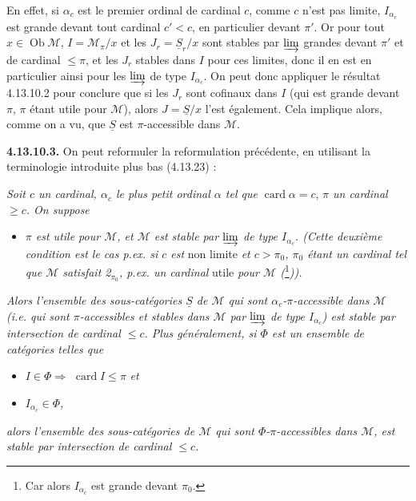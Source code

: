 \documentclass[11pt]{article}
\newcommand{\msp}[1]{\marginpar{\footnotesize [#1]}}
\newcommand{\Ob}{\operatorname{Ob}}
\newcommand{\card}{\operatorname{card}}
\begin{document}
En effet, si $\alpha_c$ est le premier ordinal de cardinal $c$, comme $c$ n'est pas limite, $I_{\alpha_c}$ est grande devant tout cardinal $c'<c$, en particulier devant $\pi'$. Or pour tout $x\in\Ob\mathcal{M}$, $I=\mathcal{M}_\pi/x$ et les $J_r=\underline{S}_r/x$ sont stables par $\varinjlim$ grandes devant $\pi'$ et de cardinal $\leqslant\pi$,
\msp{page 302 bis}
et les $J_r$ stables dans $I$ pour ces limites, donc il en est en particulier ainsi pour les $\varinjlim$ de type $I_{\alpha_c}$. On peut donc appliquer le résultat 4.13.10.2 pour conclure que si les $J_r$ sont cofinaux dans $I$ (qui est grande devant $\pi$, $\pi$ étant utile pour $\mathcal{M}$), alors $J=\underline{S}/x$ l'est également. Cela implique alors, comme on a vu, que $\underline{S}$ est $\pi$-accessible dans $\mathcal{M}$.

\textbf{4.13.10.3.} On peut reformuler la reformulation précédente, en utilisant la terminologie introduite plus bas (4.13.23) :

\textit{Soit $c$ un cardinal, $\alpha_c$ le plus petit ordinal $\alpha$ tel que} $\card\alpha=c$, \textit{$\pi$ un cardinal $\geqslant c$. On suppose}
\begin{itemize}
\item[$(*)$] \textit{$\pi$ est utile pour $\mathcal{M}$, et $\mathcal{M}$ est stable par $\varinjlim$ de type $I_{\alpha_c}$. (Cette deuxième condition est le cas p.ex. si $c$ est} non limite \textit{et $c>\pi_0$, $\pi_0$ étant un cardinal tel que $\mathcal{M}$ satisfait \textit{2}$_{\pi_0}$, p.ex. un cardinal} utile \textit{pour $\mathcal{M}$ (}\footnote[131]{Car alors $I_{\alpha_c}$ est grande devant $\pi_0$.}\textit{)).}
\end{itemize}
\textit{Alors l'ensemble des sous-catégories $\underline{S}$ de $\mathcal{M}$ qui sont $\alpha_c$-$\pi$-accessible dans $\mathcal{M}$ (i.e. qui sont $\pi$-accessibles et stables dans $\mathcal{M}$ par $\varinjlim$ de type $I_{\alpha_c}$) est stable par intersection de cardinal $\leqslant c$. Plus généralement, si $\Phi$ est un ensemble de catégories telles que} %
\begin{itemize}
\item[\textit{1°)}] \textit{$I\in\Phi\Longrightarrow$} $\card I\leqslant\pi$ \textit{et}
\item[\textit{2°)}] \textit{$I_{\alpha_c}\in\Phi$,}
\end{itemize}
\textit{alors l'ensemble des sous-catégories de $\mathcal{M}$ qui sont $\Phi$-$\pi$-accessibles dans $\mathcal{M}$, est stable par intersection de cardinal $\leqslant c$.}
\end{document}
